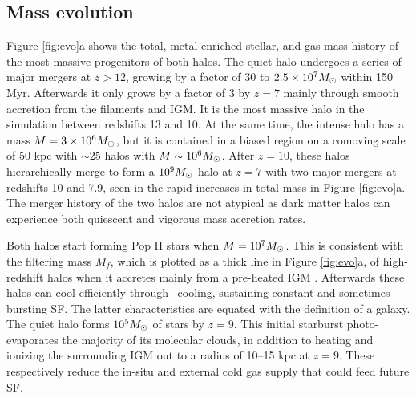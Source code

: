 \documentclass[apjl]{emulateapj}
\begin{document}
\subsection{Mass evolution}
\label{sec:halo}



\begin{figure*}
\caption{\label{fig:evo} (a) Evolution of the total halo mass (top),
  stellar mass (middle), and gas fraction (bottom) of the quiet
  (dashed) and intense (solid) halos.  In the top panel, the filtering
  halo mass is plotted as the thick black line (overlapping with the
  quiet halo after $z=9$.  (b) Mass-weighted stellar metallicities and
  gas metallicities enriched by Pop II and Pop III SNe of the intense
  (top) and quiet (bottom) halos.}
\end{figure*}


Figure \ref{fig:evo}a shows the total, metal-enriched stellar, and gas
mass history of the most massive progenitors of both halos.  The quiet
halo undergoes a series of major mergers at $z > 12$, growing by a
factor of 30 to $2.5 \times 10^7 \Ms$ within 150 Myr.  Afterwards it
only grows by a factor of 3 by $z=7$ mainly through smooth accretion
from the filaments and IGM.  It is the most massive halo in the
simulation between redshifts 13 and 10.  At the same time, the intense
halo has a mass $M = 3 \times 10^6 \Ms$, but it is contained in a
biased region on a comoving scale of 50 kpc with $\sim25$ halos with
$M \sim 10^6 \Ms$.  After $z=10$, these halos hierarchically merge to
form a $10^9 \Ms$ halo at $z=7$ with two major mergers at redshifts 10
and 7.9, seen in the rapid increases in total mass in Figure
\ref{fig:evo}a.  The merger history of the two halos are not atypical
as dark matter halos can experience both quiescent and vigorous mass
accretion rates.

Both halos start forming Pop II stars when $M = 10^7 \Ms$.  This is
consistent with the filtering mass $M_f$, which is plotted as a thick
line in Figure \ref{fig:evo}a, of high-redshift halos when it accretes
mainly from a pre-heated IGM \citep{gnedin98, gnedin00, Wise08_Gal}.
Afterwards these halos can cool efficiently through \hh~cooling,
sustaining constant and sometimes bursting SF.  The latter
characteristics are equated with the definition of a galaxy.  The
quiet halo forms $10^5 \Ms$ of stars by $z=9$.  This initial starburst
photo-evaporates the majority of its molecular clouds, in addition to
heating and ionizing the surrounding IGM out to a radius of 10--15 kpc
at $z=9$.  These respectively reduce the in-situ and external cold gas
supply that could feed future SF.
\end{document}
